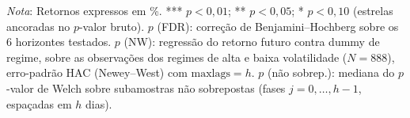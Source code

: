 \begin{table}[H]
\centering
\small
\caption{Diferença de retornos futuros entre regimes de alta e baixa volatilidade, sob quatro critérios de inferência.}
\label{tab:cap9_ttest}
\par\smallskip
\footnotesize\textit{Nota}: Retornos expressos em \%. *** $p<0{,}01$; ** $p<0{,}05$; * $p<0{,}10$ (estrelas ancoradas no $p$-valor bruto). $p$ (FDR): correção de Benjamini--Hochberg sobre os 6 horizontes testados. $p$ (NW): regressão do retorno futuro contra dummy de regime, sobre as observações dos regimes de alta e baixa volatilidade ($N=888$), erro-padrão HAC (Newey--West) com $\text{maxlags}=h$. $p$ (não sobrep.): mediana do $p$-valor de Welch sobre subamostras não sobrepostas (fases $j=0,\ldots,h-1$, espaçadas em $h$ dias).
\end{table}
